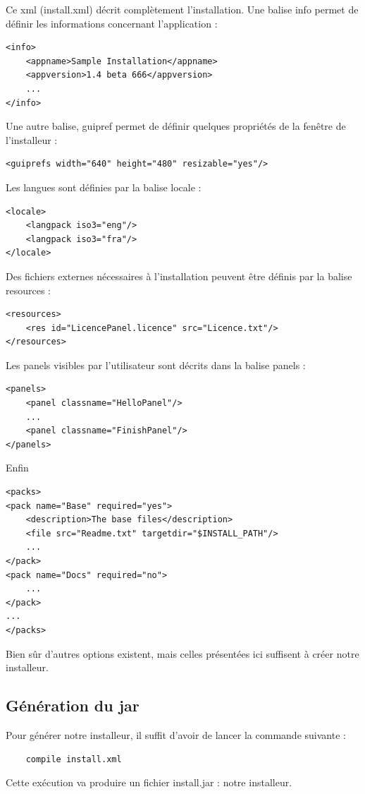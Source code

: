 
Ce xml (install.xml) décrit complètement l'installation.
Une balise info permet de définir les informations concernant l'application : 
\begin{lstlisting}
<info>
	<appname>Sample Installation</appname>
	<appversion>1.4 beta 666</appversion>
	...
</info>
\end{lstlisting}
Une autre balise, guipref permet de définir quelques propriétés de la fenêtre de l'installeur :
\begin{lstlisting}
<guiprefs width="640" height="480" resizable="yes"/>
\end{lstlisting}
Les langues sont définies par la balise locale :
\begin{lstlisting}
<locale>
	<langpack iso3="eng"/>
	<langpack iso3="fra"/>
</locale>
\end{lstlisting}
Des fichiers externes nécessaires à l'installation peuvent être définis par la balise resources :

\begin{lstlisting}
<resources>
	<res id="LicencePanel.licence" src="Licence.txt"/>
</resources>
\end{lstlisting}
Les panels visibles par l'utilisateur sont décrits dans la balise panels :
\begin{lstlisting}
<panels>
	<panel classname="HelloPanel"/>
	...
	<panel classname="FinishPanel"/>
</panels>
\end{lstlisting}
Enfin 
\begin{lstlisting}
<packs>
<pack name="Base" required="yes">
	<description>The base files</description>
	<file src="Readme.txt" targetdir="$INSTALL_PATH"/>
	...
</pack>
<pack name="Docs" required="no">
	...
</pack>
...
</packs>
\end{lstlisting}
Bien sûr d'autres options existent, mais celles présentées ici suffisent à créer notre installeur.
\subsection{Génération du jar}
Pour générer notre installeur, il suffit d'avoir de lancer la commande suivante :
\begin{verbatim}
	compile install.xml
\end{verbatim}
Cette exécution va produire un fichier install.jar : notre installeur.
